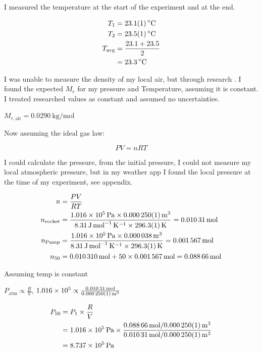 \documentclass[12pt,a4paper]{article}
\begin{document}
I measured the temperature at the start of the experiment and at the end.

\begin{align}
T_1 &= \SI{23.1 \pm 0.1}{\celsius} \\
T_2 &= \SI{23.5 \pm 0.1}{\celsius} \\
T_{\text{avg}} &= \frac{23.1 + 23.5}{2} \\
&= \SI{23.3}{\celsius}
\end{align}

I was unable to measure the density of my local air, but through research \cite{ref14}. I found the expected $M_r$ for my pressure and Temperature, assuming it is constant. I treated researched values as constant and assumed no uncertainties.

$M_{r,\text{air}} = \SI{0.0290}{\kilo\gram\per\mol}$

Now assuming the ideal gas law:

\begin{equation}
PV = nRT
\end{equation}

I could calculate the pressure, from the initial pressure, I could not measure my local atmospheric pressure, but in my weather app I found the local pressure at the time of my experiment, see appendix.

\begin{align}
n &= \frac{PV}{RT} \\
n_{\text{rocket}} &= \frac{\SI{1.016e5}{\pascal} \times \SI{0.000250 \pm 0.000001}{\meter\cubed}}{\SI{8.31}{\joule\per\mol\per\kelvin} \times \SI{296.3 \pm 0.1}{\kelvin}} = \SI{0.01031}{\mol} \\
n_{\text{Pump}} &= \frac{\SI{1.016e5}{\pascal} \times \SI{0.000038}{\meter\cubed}}{\SI{8.31}{\joule\per\mol\per\kelvin} \times \SI{296.3 \pm 0.1}{\kelvin}} = \SI{0.001567}{\mol} \\
n_{50} &= \SI{0.010310}{\mol} + 50 \times \SI{0.001567}{\mol} = \SI{0.08866}{\mol}
\end{align}

Assuming temp is constant

$P_{\text{atm}} \propto \frac{R}{V}$, $\SI{1.016e5}{} \propto \frac{\SI{0.01031}{\mol}}{\SI{0.000250 \pm 0.000001}{\meter\cubed}}$

\begin{align}
P_{50} &= P_1 \times \frac{R}{V} \\
&= \SI{1.016e5}{\pascal} \times \frac{\SI{0.08866}{\mol} / \SI{0.000250 \pm 0.000001}{\meter\cubed}}{\SI{0.01031}{\mol} / \SI{0.000250 \pm 0.000001}{\meter\cubed}} \\
&= \SI{8.737e5}{\pascal}
\end{align}
\end{document}

